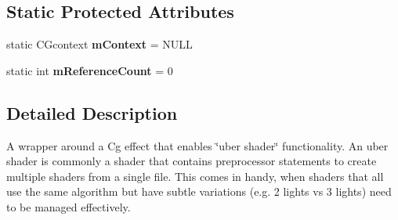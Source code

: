 \subsection*{\-Static \-Protected \-Attributes}
\begin{DoxyCompactItemize}
\item 
\hypertarget{class_verdi_1_1_cg_uber_shader_a70cc73fc4d25128d50c28118339a621a}{static \-C\-Gcontext {\bfseries m\-Context} = \-N\-U\-L\-L}\label{class_verdi_1_1_cg_uber_shader_a70cc73fc4d25128d50c28118339a621a}

\item 
\hypertarget{class_verdi_1_1_cg_uber_shader_a5c1fe8f3d1be4e23881e1bc759868d10}{static int {\bfseries m\-Reference\-Count} = 0}\label{class_verdi_1_1_cg_uber_shader_a5c1fe8f3d1be4e23881e1bc759868d10}

\end{DoxyCompactItemize}


\subsection{\-Detailed \-Description}
\-A wrapper around a \-Cg effect that enables \char`\"{}uber shader\char`\"{} functionality. \-An uber shader is commonly a shader that contains preprocessor statements to create multiple shaders from a single file. \-This comes in handy, when shaders that all use the same algorithm but have subtle variations (e.\-g. 2 lights vs 3 lights) need to be managed effectively. 

